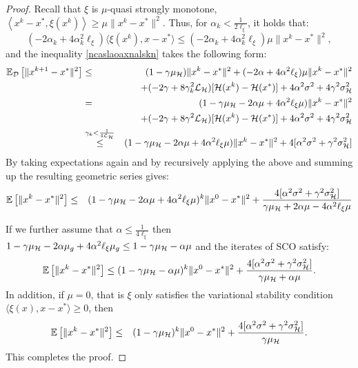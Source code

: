 \documentclass{article}
\begin{document}
\begin{proof}
Recall that $\xi$ is $\mu$-quasi strongly monotone, $\left\langle x^k-x^*, \xi(x^k)\right\rangle \geq \mu \|x^k-x^*\|^2$.
Thus, for $\alpha_k < \frac{1}{2 \ell_{\xi}}$, it holds that:
$$(-2 \alpha_k + 4\alpha_k^2  \ell_{\xi} ) \langle\xi(x^k),x-x^*\rangle \leq (-2 \alpha_k + 4\alpha_k^2  \ell_{\xi}) \mu \|x^k-x^*\|^2,$$
and the inequality \eqref{ncaslaoaxnalskn} takes the following form:
\begin{eqnarray}
\label{canjadnakdl}
\mathbb{E}_{{\cal D}} \left[ \|x^{k+1}-x^*\|^2 \right] &\leq& (1-\gamma\mu_{{\cal H}} )\|x^k-x^*\|^2 + (-2 \alpha + 4\alpha^2  \ell_{\xi}) \mu \|x^k-x^*\|^2 \notag\\ && + (- 2 \gamma + 8 \gamma_k^2 {\cal L}_{{\cal H}}) [{\cal H}(x^k)-{\cal H}(x^*)] + 4\alpha^2 \sigma^2 + 4 \gamma^2  \sigma_{{\cal H}}^2 \notag\\
&=& (1-\gamma\mu_{{\cal H}} -2 \alpha \mu + 4\alpha^2  \ell_{\xi}\mu )\|x^k-x^*\|^2  \notag\\ && + (- 2 \gamma + 8 \gamma^2 {\cal L}_{{\cal H}}) [{\cal H}(x^k)-{\cal H}(x^*)] + 4\alpha^2 \sigma^2 + 4 \gamma^2  \sigma_{{\cal H}}^2 \notag\\
&\overset{\gamma_k < \frac{1}{4{\cal L}_{{\cal H}}}}{\leq}&(1-\gamma\mu_{{\cal H}}  -2 \alpha\mu + 4\alpha^2  \ell_{\xi}\mu )\|x^k-x^*\|^2 + 4[\alpha^2 \sigma^2 + \gamma^2  \sigma_{{\cal H}}^2] \notag\\
\end{eqnarray}
By taking expectations again and by recursively applying the above and summing up
the resulting geometric series gives:
\begin{eqnarray*}
\mathbb{E}\left[ \|x^{k}-x^*\|^2 \right]&\leq& (1-\gamma\mu_{{\cal H}}  -2 \alpha\mu + 4\alpha^2  \ell_{\xi}\mu )^k\|x^0-x^*\|^2 + \frac{4[\alpha^2 \sigma^2 + \gamma^2  \sigma_{{\cal H}}^2]}{\gamma\mu_{{\cal H}} +2 \alpha\mu - 4\alpha^2 \ell_{\xi}\mu}\notag\\
\end{eqnarray*}

If we further assume that $\alpha \leq \frac{1}{4\ell_\xi}$ then $1-\gamma\mu_{{\cal H}}  -2 \alpha\mu_g + 4\alpha^2  \ell_{\xi}\mu_g \leq 1-\gamma\mu_{{\cal H}}  - \alpha\mu $ and the iterates of SCO satisfy:
\begin{eqnarray}
\mathbb{E}\left[ \|x^{k}-x^*\|^2 \right]\leq(1-\gamma\mu_{{\cal H}}  - \alpha\mu )^k\|x^0-x^*\|^2 + \frac{4[\alpha^2 \sigma^2 + \gamma^2  \sigma_{{\cal H}}^2]}{\gamma\mu_{{\cal H}}  +\alpha\mu}.
\end{eqnarray}
In addition, if $\mu=0$, that is $\xi$ only satisfies the variational stability condition $\langle\xi(x),x-x^*\rangle \geq0$, then
\begin{eqnarray}
\mathbb{E} \left[ \|x^{k}-x^*\|^2 \right]&\leq& (1-\gamma \mu_{{\cal H}} )^k \|x^0-x^*\|^2  + \frac{4 [\alpha^2 \sigma^2 +  \gamma^2  \sigma_{{\cal H}}^2]}{\gamma \mu_{{\cal H}} }.
\end{eqnarray}
This completes the proof.
\end{proof}
\end{document}
